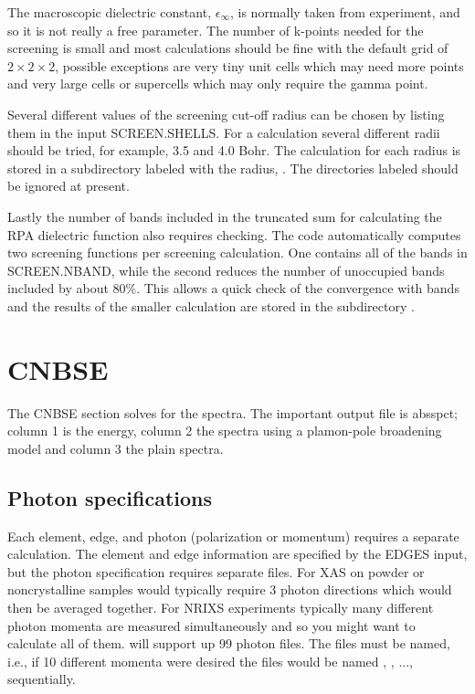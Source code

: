 \documentclass[11pt]{report}
\begin{document}
The macroscopic dielectric constant, $\epsilon_\infty$, is normally taken from experiment, and so it is not really a free parameter. The number of k-points needed for the screening is small and most calculations should be fine with the default grid of $2\times2\times2$, possible exceptions are very tiny unit cells which may need more points and very large cells or supercells which may only require the gamma point. 

Several different values of the screening cut-off radius can be chosen by listing them in the input SCREEN.SHELLS. For a calculation several different radii should be tried, for example, 3.5 and 4.0 Bohr. The calculation for each radius is stored in a subdirectory labeled with the radius, . The directories labeled  should be ignored at present. 

Lastly the number of bands included in the truncated sum for calculating the RPA dielectric function also requires checking. The code automatically computes two screening functions per screening calculation. One contains all of the bands in SCREEN.NBAND, while the second reduces the number of unoccupied bands included by about 80\%. This allows a quick check of the convergence with bands and the results of the smaller calculation are stored in the subdirectory .


\chapter{ CNBSE }
The CNBSE section solves for the spectra. The important output file is absspct; column 1 is the energy, 
column 2 the spectra using a plamon-pole broadening model and column 3 the plain spectra.

\iffalse
\section{Photon specifications}

Each element, edge, and photon (polarization or momentum) requires a separate calculation. 
The element and edge information are specified by the EDGES input, but the photon specification requires separate files. For XAS on 
powder or noncrystalline samples would typically require 3 photon directions which would then be averaged together. For NRIXS 
experiments typically many different photon momenta are measured simultaneously and so you might want to calculate all of them. 
 will support up 99 photon files. The files must be named, i.e., if 10 different momenta were desired the files would be named 
, , ...,  sequentially. 
\end{document}
